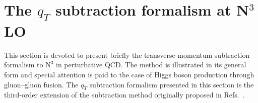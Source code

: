 \documentclass[12pt]{article}
\DeclareRobustCommand{\qt}{\ensuremath{q_T}\xspace}
\DeclareRobustCommand{\LO}{\text{LO}\xspace}
\DeclareRobustCommand{\N}[1]{\ensuremath{\text{N}^{#1}}} %
\begin{document}
\section{The \texorpdfstring{$\qt$}{qT} subtraction formalism at \texorpdfstring{N${}^\text{3}$LO}{N3LO}}
\label{sec:forma}
This section is devoted to present briefly the transverse-momentum subtraction formalism to \N3\LO in perturbative QCD. The method is illustrated in its general form and special attention is paid to the case of Higgs boson production through gluon--gluon fusion. The $\qt$ subtraction formalism presented in this section is the third-order extension of the subtraction method originally proposed in Refs.~\cite{Catani:2007vq,Bozzi:2005wk,Bonciani:2015sha}.
\end{document}
